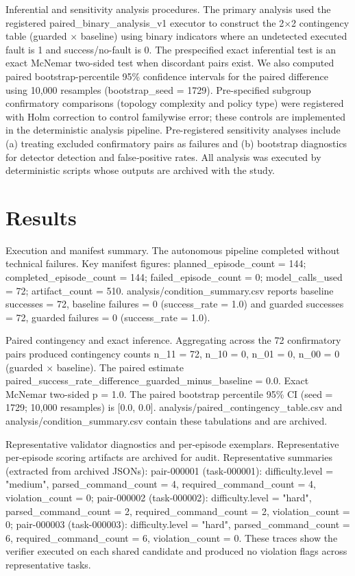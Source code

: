 \documentclass[conference]{IEEEtran}
\begin{document}
Inferential and sensitivity analysis procedures. The primary analysis used the registered paired\_binary\_analysis\_v1 executor to construct the 2\ensuremath{\times}2 contingency table (guarded \ensuremath{\times} baseline) using binary indicators where an undetected executed fault is 1 and success/no-fault is 0. The prespecified exact inferential test is an exact McNemar two-sided test when discordant pairs exist. We also computed paired bootstrap-percentile 95\% confidence intervals for the paired difference using 10,000 resamples (bootstrap\_seed = 1729). Pre-specified subgroup confirmatory comparisons (topology complexity and policy type) were registered with Holm correction to control familywise error; these controls are implemented in the deterministic analysis pipeline. Pre-registered sensitivity analyses include (a) treating excluded confirmatory pairs as failures and (b) bootstrap diagnostics for detector detection and false‑positive rates. All analysis was executed by deterministic scripts whose outputs are archived with the study.

\section{Results}
Execution and manifest summary. The autonomous pipeline completed without technical failures. Key manifest figures: planned\_episode\_count = 144; completed\_episode\_count = 144; failed\_episode\_count = 0; model\_calls\_used = 72; artifact\_count = 510. analysis/condition\_summary.csv reports baseline successes = 72, baseline failures = 0 (success\_rate = 1.0) and guarded successes = 72, guarded failures = 0 (success\_rate = 1.0).

Paired contingency and exact inference. Aggregating across the 72 confirmatory pairs produced contingency counts n\_11 = 72, n\_10 = 0, n\_01 = 0, n\_00 = 0 (guarded \ensuremath{\times} baseline). The paired estimate paired\_success\_rate\_difference\_guarded\_minus\_baseline = 0.0. Exact McNemar two-sided p = 1.0. The paired bootstrap percentile 95\% CI (seed = 1729; 10,000 resamples) is [0.0, 0.0]. analysis/paired\_contingency\_table.csv and analysis/condition\_summary.csv contain these tabulations and are archived.

Representative validator diagnostics and per-episode exemplars. Representative per-episode scoring artifacts are archived for audit. Representative summaries (extracted from archived JSONs): pair-000001 (task-000001): difficulty.level = "medium", parsed\_command\_count = 4, required\_command\_count = 4, violation\_count = 0; pair-000002 (task-000002): difficulty.level = "hard", parsed\_command\_count = 2, required\_command\_count = 2, violation\_count = 0; pair-000003 (task-000003): difficulty.level = "hard", parsed\_command\_count = 6, required\_command\_count = 6, violation\_count = 0. These traces show the verifier executed on each shared candidate and produced no violation flags across representative tasks.
\end{document}
